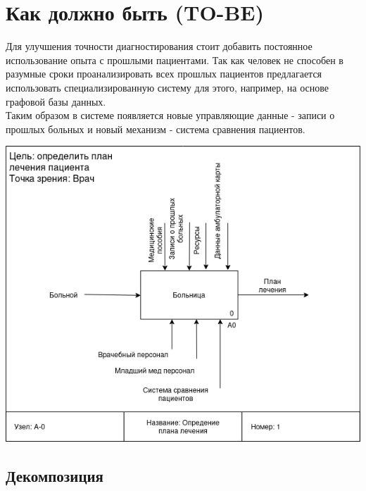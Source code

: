 \documentclass[a4paper, 12pt]{article}
\begin{document}
\section{Как должно быть (TO-BE)}
Для улучшения точности диагностирования стоит добавить постоянное использование опыта с прошлыми пациентами. Так как человек не способен в разумные сроки проанализировать всех прошлых пациентов предлагается использовать специализированную систему для этого, например, на основе графовой базы данных.\\
Таким образом в системе появляется новые управляющие данные - записи о прошлых больных и новый механизм - система сравнения пациентов.
\begin{center}
  \centering
  \includegraphics[width=1\linewidth]{extra/to-be_context.png}
  \label{fig:prplot}
\end{center}
\subsection{Декомпозиция}
\end{document}

